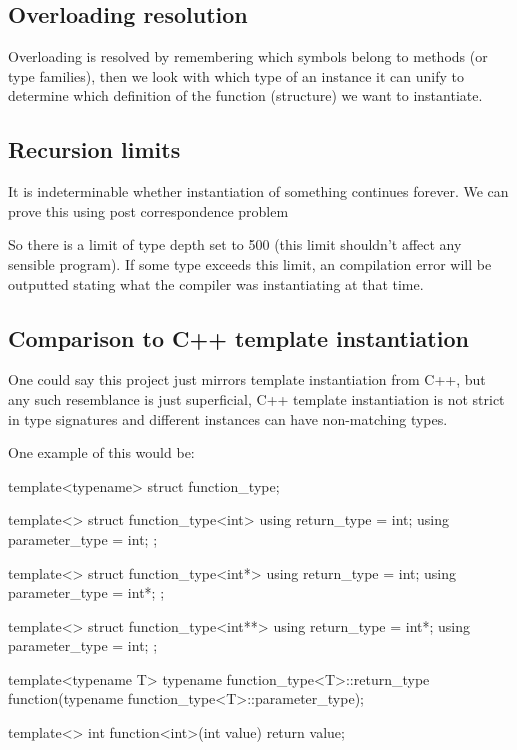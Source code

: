 \subsection{Overloading resolution}

Overloading is resolved by remembering which symbols belong to methods (or type families), then we look with which type of an
instance it can unify to determine which definition of the function (structure) we want to instantiate.

\subsection{Recursion limits}

It is indeterminable whether instantiation of something continues forever. We can prove this using post correspondence problem %

So there is a limit of type depth set to 500 (this limit shouldn't affect any sensible program).
If some type exceeds this limit, an compilation error will be outputted stating what the compiler was instantiating
at that time.

\subsection{Comparison to C++ template instantiation}

One could say this project just mirrors template instantiation from C++, but any such resemblance is just
superficial, C++ template instantiation is not strict in type signatures and different instances can have
non-matching types.

One example of this would be:

template<typename>
struct function_type;

template<>
struct function_type<int> { using return_type = int; using parameter_type = int; };

template<>
struct function_type<int*> { using return_type = int; using parameter_type = int*; };

template<>
struct function_type<int**> { using return_type = int*; using parameter_type = int; };

template<typename T>
typename function_type<T>::return_type function(typename function_type<T>::parameter_type);

template<>
int function<int>(int value) { return value; }

